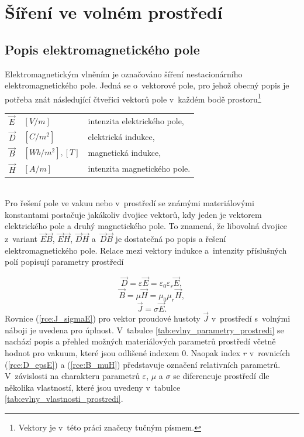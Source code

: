 
\section{Šíření ve volném prostředí} \label{sec:evlny_volne_prostredi}
\subsection{Popis elektromagnetického pole}
Elektromagnetickým vlněním je označováno šíření nestacionárního elektromagnetického pole. Jedná se o~vektorové pole, pro jehož obecný popis je potřeba znát následující čtveřici vektorů pole v~každém bodě prostoru\footnote{Vektory je v~této práci značeny tučným písmem.}\\ 

\begin{tabular}{lll}
$\vec E$ & $\unit{[V/m]}$ & intenzita elektrického pole,\\
$\vec D$ & $\unit{[C/m^{2}]}$ & elektrická indukce,\\
$\vec B$ & $\unit{[Wb/m^{2}],[T]}$ & magnetická indukce,\\
$\vec H$ & $\unit{[A/m]}$ & intenzita magnetického pole.\\
\end{tabular}\bigskip \\
Pro řešení pole ve vakuu nebo v~prostředí se známými materiálovými konstantami postačuje jakákoliv dvojice vektorů, kdy jeden je vektorem elektrického pole a druhý magnetického pole. To znamená, že libovolná dvojice z~variant $\vec E\vec B$, $\vec E\vec H$, $\vec D\vec H$ a~$\vec D\vec B$ je dostatečná po popis a řešení elektromagnetického pole.
Relace mezi vektory indukce a~intenzity příslušných polí popisují parametry prostředí 

\begin{equation}
	\vec D = \varepsilon\vec E = \varepsilon_{0}\varepsilon_{r}\vec E,
	\label{rce:D_epsE}
\end{equation}
\begin{equation}
	\vec B = \mu\vec H = \mu_{0}\mu_{r}\vec H,
	\label{rce:B_muH}
\end{equation}
\begin{equation}
	\vec J = \sigma\vec E.
	\label{rce:J_sigmaE}
\end{equation}
Rovnice (\ref{rce:J_sigmaE}) pro vektor proudové hustoty $\vec J$ v~prostředí s~volnými náboji je uvedena pro úplnost. V~tabulce \ref{tab:evlny_parametry_prostredi} se nachází popis a přehled možných materiálových parametrů prostředí včetně hodnot pro vakuum, které jsou odlišené indexem $0$. Naopak index $r$ v~rovnicích (\ref{rce:D_epsE}) a (\ref{rce:B_muH}) představuje označení relativních parametrů. V~závislosti na charakteru parametrů $\varepsilon$, $\mu$ a $\sigma$ se diferencuje prostředí dle několika vlastností, které jsou uvedeny v~tabulce \ref{tab:evlny_vlastnosti_prostredi}.

